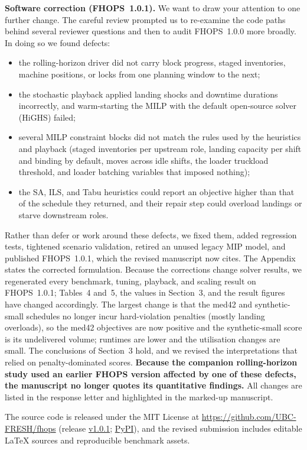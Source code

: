 \documentclass[10pt]{article}
\begin{document}
\textbf{Software correction (FHOPS~1.0.1).} We want to draw your attention to one further change. The careful review prompted us to re-examine the code paths behind several reviewer questions and then to audit FHOPS~1.0.0 more broadly. In doing so we found defects:
\begin{itemize}
  \item the rolling-horizon driver did not carry block progress, staged inventories, machine positions, or locks from one planning window to the next;
  \item the stochastic playback applied landing shocks and downtime durations incorrectly, and warm-starting the MILP with the default open-source solver (HiGHS) failed;
  \item several MILP constraint blocks did not match the rules used by the heuristics and playback (staged inventories per upstream role, landing capacity per shift and binding by default, moves across idle shifts, the loader truckload threshold, and loader batching variables that imposed nothing);
  \item the SA, ILS, and Tabu heuristics could report an objective higher than that of the schedule they returned, and their repair step could overload landings or starve downstream roles.
\end{itemize}
Rather than defer or work around these defects, we fixed them, added regression tests, tightened scenario validation, retired an unused legacy MIP model, and published FHOPS~1.0.1, which the revised manuscript now cites. The Appendix states the corrected formulation. Because the corrections change solver results, we regenerated every benchmark, tuning, playback, and scaling result on FHOPS~1.0.1; Tables~4 and~5, the values in Section~3, and the result figures have changed accordingly. The largest change is that the med42 and synthetic-small schedules no longer incur hard-violation penalties (mostly landing overloads), so the med42 objectives are now positive and the synthetic-small score is its undelivered volume; runtimes are lower and the utilisation changes are small. The conclusions of Section~3 hold, and we revised the interpretations that relied on penalty-dominated scores. \textbf{Because the companion rolling-horizon study used an earlier FHOPS version affected by one of these defects, the manuscript no longer quotes its quantitative findings.}
All changes are listed in the response letter and highlighted in the marked-up manuscript.

The source code is released under the MIT License at \url{https://github.com/UBC-FRESH/fhops} (release \href{https://github.com/UBC-FRESH/fhops/releases/tag/v1.0.1}{v1.0.1}; \href{https://pypi.org/project/fhops/1.0.1/}{PyPI}), and the revised submission includes editable LaTeX sources and reproducible benchmark assets.
\end{document}
